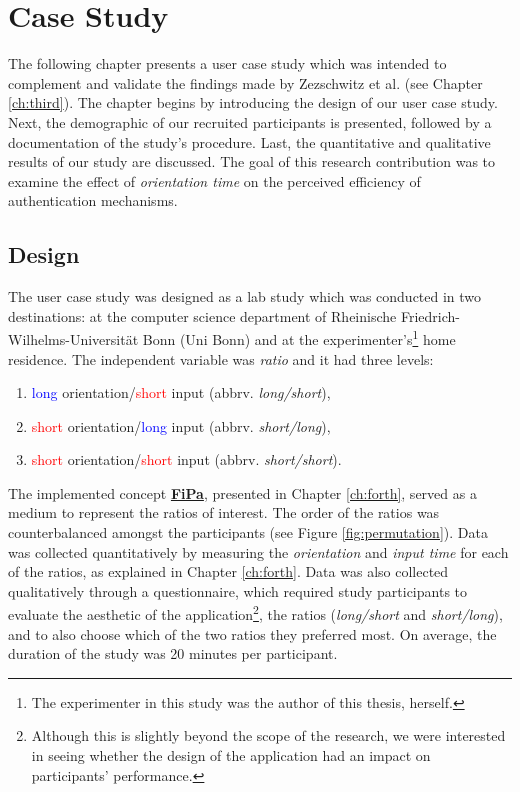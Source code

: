 
\chapter{Case Study}\label{ch:fifth}

The following chapter presents a user case study which was intended to complement and validate the findings made by Zezschwitz et al. \cite{Zezschwitz} (see Chapter \ref{ch:third}). The chapter begins by introducing the design of our user case study. Next, the demographic of our recruited participants is presented, followed by a documentation of the study's procedure. Last, the quantitative and qualitative results of our study are discussed. The goal of this research contribution was to examine the effect of \textit{orientation time} on the perceived efficiency of authentication mechanisms. 

\section{Design} \label{5.1}

The user case study was designed as a lab study which was conducted in two destinations: at the computer science department of Rheinische Friedrich-Wilhelms-Universit{\"a}t Bonn (Uni Bonn) and at the experimenter's\footnote{The experimenter in this study was the author of this thesis, herself.} home residence. The independent variable was \textit{ratio} and it had three levels:
\begin{enumerate}
    \item \textcolor{blue}{long} orientation/\textcolor{red}{short} input (abbrv. \textit{long/short}), 
    \item \textcolor{red}{short} orientation/\textcolor{blue}{long} input (abbrv. \textit{short/long}), 
    \item \textcolor{red}{short} orientation/\textcolor{red}{short} input (abbrv. \textit{short/short}). 
\end{enumerate}

The implemented concept \underline{\textbf{FiPa}}, presented in Chapter \ref{ch:forth}, served as a medium to represent the ratios of interest. The order of the ratios was counterbalanced amongst the participants (see Figure \ref{fig:permutation}). Data was collected quantitatively by measuring the \textit{orientation} and \textit{input time} for each of the ratios, as explained in Chapter \ref{ch:forth}. Data was also collected qualitatively through a questionnaire, which required study participants to evaluate the aesthetic of the application\footnote{Although this is slightly beyond the scope of the research, we were interested in seeing whether the design of the application had an impact on participants' performance.}, the ratios (\textit{long/short} and \textit{short/long}), and to also choose which of the two ratios they preferred most. On average, the duration of the study was 20 minutes per participant. 

